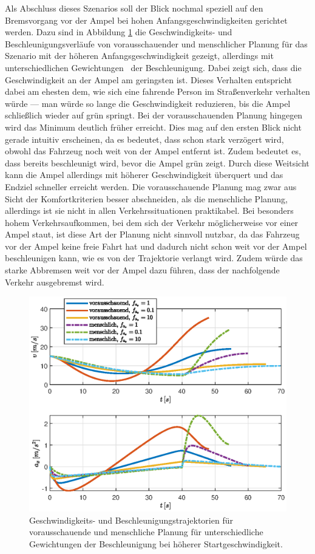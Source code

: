 Als Abschluss dieses Szenarios soll der Blick nochmal speziell auf den Bremsvorgang vor der Ampel bei hohen Anfangsgeschwindigkeiten gerichtet werden. Dazu sind in Abbildung \ref{fig:va_fa_variabel} die Geschwindigkeits- und Beschleunigungsverläufe von vorausschauender und menschlicher Planung für das Szenario mit der höheren Anfangsgeschwindigkeit gezeigt, allerdings mit unterschiedlichen Gewichtungen \fax~der Beschleunigung. Dabei zeigt sich, dass die Geschwindigkeit an der Ampel am geringsten ist. Dieses Verhalten entspricht dabei am ehesten dem, wie sich eine fahrende Person im Straßenverkehr verhalten würde --- man würde so lange die Geschwindigkeit reduzieren, bis die Ampel schließlich wieder auf grün springt. Bei der vorausschauenden Planung hingegen wird das Minimum deutlich früher erreicht. Dies mag auf den ersten Blick nicht gerade intuitiv erscheinen, da es bedeutet, dass schon stark verzögert wird, obwohl das Fahrzeug noch weit von der Ampel entfernt ist. Zudem bedeutet es, dass bereits beschleunigt wird, bevor die Ampel grün zeigt. Durch diese Weitsicht kann die Ampel allerdings mit höherer Geschwindigkeit überquert und das Endziel schneller erreicht werden. Die vorausschauende Planung mag zwar aus Sicht der Komfortkriterien besser abschneiden, als die menschliche Planung, allerdings ist sie nicht in allen Verkehrssituationen praktikabel. Bei besonders hohem Verkehrsaufkommen, bei dem sich der Verkehr möglicherweise vor einer Ampel staut, ist diese Art der Planung nicht sinnvoll nutzbar, da das Fahrzeug vor der Ampel keine freie Fahrt hat und dadurch nicht schon weit vor der Ampel beschleunigen kann, wie es von der Trajektorie verlangt wird. Zudem würde das starke Abbremsen weit vor der Ampel dazu führen, dass der nachfolgende Verkehr ausgebremst wird.
\begin{figure}[h] 
	\centering
	\includegraphics[width=0.9\linewidth]{./Bilder/Ergebnisse/Geradeausfahrt/Ampel/v_5_v_15/va_fa_variabel.eps}
	\caption{Geschwindigkeits- und Beschleunigungstrajektorien für vorausschauende und menschliche Planung für unterschiedliche Gewichtungen der Beschleunigung bei höherer Startgeschwindigkeit.}
	\label{fig:va_fa_variabel}
\end{figure}  

